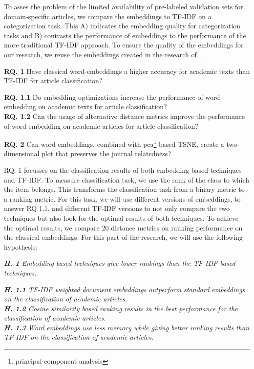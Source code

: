 \documentclass[../../Thesis.tex]{subfiles}
\begin{document}
To asses the problem of the limited availability of pre-labeled validation sets for domain-specific articles, we compare the embeddings to  TF-IDF on a categorization task. This A) indicates the embedding quality for categorization tasks and B) contrasts the performance of embeddings to the performance of the more traditional TF-IDF approach. To ensure the quality of the embeddings for our research, we reuse the embeddings created in the research of~\citet{Truong2017Thesis}.
\begin{jumpin}
    \textbf{RQ. 1} Have classical word-embeddings a higher accuracy for academic texts than TF-IDF for article classification?\\
    \begin{adjustwidth}{0.3in}{}
        \textbf{RQ. 1.1} Do embedding optimizations increase the performance of word embedding on academic texts for article classification?\\
        \textbf{RQ. 1.2} Can the usage of alternative distance metrics improve the performance of word embedding on academic articles for article classification?
    \end{adjustwidth}
    \vspace{0.1in}\textbf{RQ. 2} Can word embeddings, combined with pca\footnote{principal component analysis}-based TSNE, create a two-dimensional plot that preserves the journal relatedness?
\end{jumpin}
RQ. 1 focusses on the classification results of both embedding-based techniques and TF-IDF.  To measure classification task, we use the rank of the class to which the item belongs. This transforms the classification task from a binary metric to a ranking metric. For this task, we will use different versions of embeddings, to answer RQ 1.1, and different TF-IDF versions to not only compare the two techniques but also look for the optimal results of both techniques. To achieve the optimal results, we compare 20 distance metrics on ranking performance on the classical embeddings. For this part of the research, we will use the following hypothesis:
\begin{jumpin}
\textit{\textbf{H. 1} Embedding based techniques give lower rankings than the TF-IDF based techniques.}
\begin{jumpin}
\textit{\textbf{H. 1.1} TF-IDF weighted document embeddings outperform standard embeddings on the classification of academic articles.}\\
\textit{\textbf{H. 1.2} Cosine similarity based ranking results in the best performance for the classification of academic articles.}\\
\textit{\textbf{H. 1.3} Word embeddings use less memory while giving better ranking results than TF-IDF on the classification of academic articles.}
\end{jumpin}
\end{jumpin}
\end{document}
